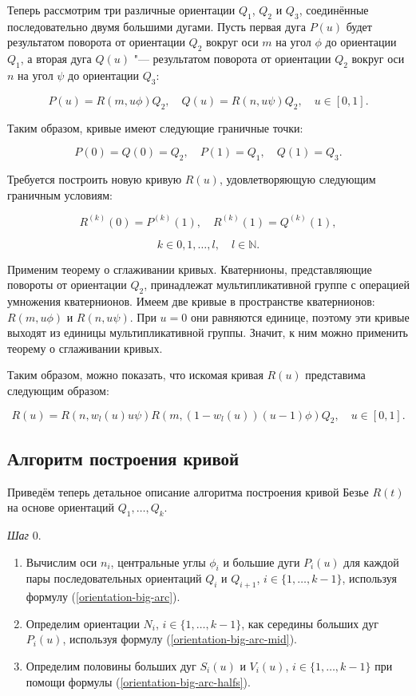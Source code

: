 Теперь рассмотрим три различные ориентации $Q_1$, $Q_2$ и $Q_3$, соединённые последовательно двумя большими
дугами. Пусть первая дуга $P(u)$ будет результатом поворота от ориентации $Q_2$ вокруг оси $m$ на угол $\phi$ до
ориентации $Q_1$, а вторая дуга $Q(u)$ "--- результатом поворота от ориентации $Q_2$ вокруг оси $n$ на угол $\psi$ до
ориентации $Q_3$:

$$
P(u)=R(m,u\phi)Q_2, \quad Q(u)=R(n,u\psi)Q_2, \quad u \in [0,1].
$$

Таким образом, кривые имеют следующие граничные точки:

$$
P(0)=Q(0)=Q_2, \quad P(1)=Q_1, \quad Q(1)=Q_3.
$$

Требуется построить новую кривую $R(u)$, удовлетворяющую следующим граничным условиям:

$$
R^{(k)}(0)=P^{(k)}(1), \quad R^{(k)}(1)=Q^{(k)}(1),
$$

$$
k \in {0,1,\dots,l}, \quad l \in \mathbb{N}.
$$

Применим теорему о сглаживании кривых. Кватернионы, представляющие повороты от ориентации $Q_2$, принадлежат
мультипликативной группе с операцией умножения кватернионов. Имеем две кривые в пространстве кватернионов:
$R(m,u\phi)$ и $R(n,u\psi)$. При $u=0$ они равняются единице, поэтому эти кривые выходят из единицы мультипликативной
группы. Значит, к ним можно применить теорему о сглаживании кривых.

Таким образом, можно показать, что искомая кривая $R(u)$ представима следующим образом:

$$
R(u)=R(n,w_l(u)u\psi)R(m,(1-w_l(u))(u-1)\phi)Q_2, \quad u \in [0,1].
$$

\subsection*{Алгоритм построения кривой}

Приведём теперь детальное описание алгоритма построения кривой Безье $R(t)$ на основе ориентаций $Q_1,\dots,Q_k$.

\bigskip
\textit{Шаг} 0.

\begin{enumerate}
\item Вычислим оси $n_i$, центральные углы $\phi_i$ и большие дуги $P_i(u)$ для каждой пары последовательных ориентаций
$Q_i$ и $Q_{i+1}$, $i \in \{1,\dots,k-1\}$, используя формулу (\ref{orientation-big-arc}).
\item Определим ориентации $N_i$, $i \in \{1,\dots,k-1\}$, как середины больших дуг $P_i(u)$, используя формулу
(\ref{orientation-big-arc-mid}).
\item Определим половины больших дуг $S_i(u)$ и $V_i(u)$, $i \in \{1,\dots,k-1\}$ при помощи формулы
(\ref{orientation-big-arc-halfs}).
\end{enumerate}

